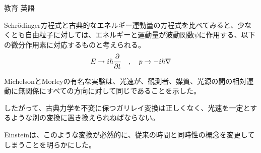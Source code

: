 \documentclass[fleqn]{jbook}
\begin{document}
\begin{question}{教育 英語}{}
\begin{subquestions}
\begin{subsubquestions}
\SubSubQuestion
Schr\"{o}dinger方程式と古典的なエネルギー運動量の方程式を比べてみると、少なくとも自由粒子に対しては、エネルギーと運動量が波動関数$\psi$に作用する、以下の微分作用素に対応するものと考えられる。
\[
E \to i\hbar \frac{\partial}{\partial t} \quad,\quad p \to -i\hbar \nabla
\]

\SubSubQuestion
MichelsonとMorleyの有名な実験は、光速が、観測者、媒質、光源の間の相対運動に無関係にすべての方向に対して同じであることを示した。

\SubSubQuestion
したがって、古典力学を不変に保つガリレイ変換は正しくなく、光速を一定とするような別の変換に置き換えられねばならない。

\SubSubQuestion
Einsteinは、このような変換が必然的に、従来の時間と同時性の概念を変更してしまうことを明らかにした。

\end{subsubquestions}

\end{subquestions}

\end{question}
\end{document}
